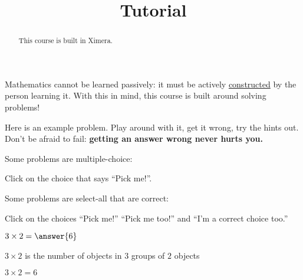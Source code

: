 \documentclass{ximera}
\title{Tutorial}
\begin{document}
\begin{abstract}
  This course is built in Ximera.
\end{abstract}\maketitle

Mathematics cannot be learned passively: it must be actively
\href{http://en.wikipedia.org/wiki/Constructivism_(philosophy_of_education)}{constructed}
by the person learning it.  With this in mind, this course is built
around solving problems!

Here is an example problem.  Play around with it, get it wrong, try
the hints out.  Don't be afraid to fail: \textbf{getting an answer wrong never
  hurts you.}


\begin{problem}
  Some problems are multiple-choice:
  \begin{multipleChoice}
  \end{multipleChoice}
  \begin{hint}
    Click on the choice that says ``Pick me!''.
  \end{hint}
\end{problem}


\begin{problem}
  Some problems are select-all that are correct:
  \begin{multipleChoice}
  \end{multipleChoice}
  \begin{hint}
    Click on the choices ``Pick me!'' ``Pick me too!'' and ``I'm a correct choice too.''
  \end{hint}
\end{problem}


\begin{problem}
  $3\times 2 = \answer{6}$   
  \begin{hint}
    $3 \times 2$ is the number of objects in $3$ groups of $2$ objects
  \end{hint}
  \begin{hint}
  \end{hint}
  \begin{hint}
    $3\times 2=6$
  \end{hint}
\end{problem}
\end{document}
